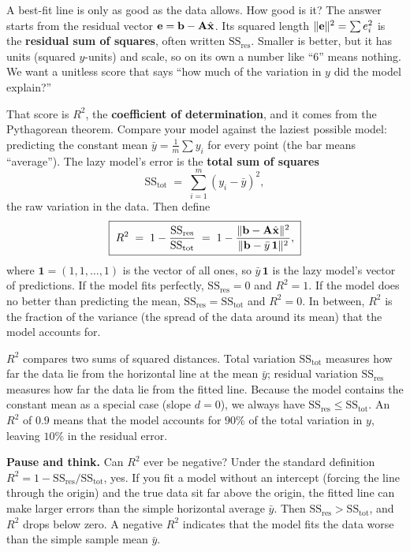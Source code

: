 A best-fit line is only as good as the data allows. How good is it? The answer starts from
the residual vector $\mathbf{e}=\mathbf{b}-\mathbf{A}\hat{\mathbf{x}}$. Its squared length
$\lVert\mathbf{e}\rVert^2=\sum e_i^2$ is the \textbf{residual sum of squares}, often written $\mathrm{SS_{res}}$.
Smaller is better, but it has units (squared $y$-units) and scale, so on its own a number like
``$6$'' means nothing. We want a unitless score that says ``how much of the variation in $y$ did
the model explain?''

That score is $R^2$, the \textbf{coefficient of determination}, and it comes from the Pythagorean
theorem. Compare your model against the laziest possible model: predicting the constant
mean $\bar{y}=\tfrac1m\sum y_i$ for every point (the bar means ``average''). The lazy model's error
is the \textbf{total sum of squares}
\[
  \mathrm{SS_{tot}} \;=\; \sum_{i=1}^m (y_i-\bar{y})^2,
\]
the raw variation in the data. Then define
\[
  \boxed{\;R^2 \;=\; 1 - \dfrac{\mathrm{SS_{res}}}{\mathrm{SS_{tot}}}
  \;=\; 1 - \dfrac{\lVert\mathbf{b}-\mathbf{A}\hat{\mathbf{x}}\rVert^2}{\lVert\mathbf{b}-\bar{y}\,\mathbf{1}\rVert^2},\;}
\]
where $\mathbf{1}=(1,1,\dots,1)$ is the vector of all ones, so $\bar{y}\,\mathbf{1}$ is the lazy
model's vector of predictions.
If the model fits perfectly, $\mathrm{SS_{res}}=0$ and $R^2=1$. If the model does no better than
predicting the mean, $\mathrm{SS_{res}}=\mathrm{SS_{tot}}$ and $R^2=0$. In between, $R^2$ is the
fraction of the variance (the spread of the data around its mean) that the model accounts for.

\begin{intuitionbox}
$R^2$ compares two sums of squared distances. Total variation $\mathrm{SS_{tot}}$
measures how far the data lie from the horizontal line at the mean
$\bar{y}$; residual variation $\mathrm{SS_{res}}$ measures how far the data lie
from the fitted line. Because the model contains the constant mean as a
special case (slope $d=0$), we always have $\mathrm{SS_{res}}\le\mathrm{SS_{tot}}$.
An $R^2$ of $0.9$ means that the model accounts for $90\%$ of the total
variation in $y$, leaving $10\%$ in the residual error.
\end{intuitionbox}

\begin{recoverybox}
\textbf{Pause and think.} Can $R^2$ ever be negative?
Under the standard definition $R^2 = 1 - \mathrm{SS_{res}}/\mathrm{SS_{tot}}$, yes. If you fit a
model without an intercept (forcing the line through the origin) and the true data sit far above the
origin, the fitted line can make larger errors than the simple horizontal average $\bar{y}$. Then
$\mathrm{SS_{res}} > \mathrm{SS_{tot}}$, and $R^2$ drops below zero. A negative $R^2$ indicates
that the model fits the data worse than the simple sample mean $\bar{y}$.
\end{recoverybox}

